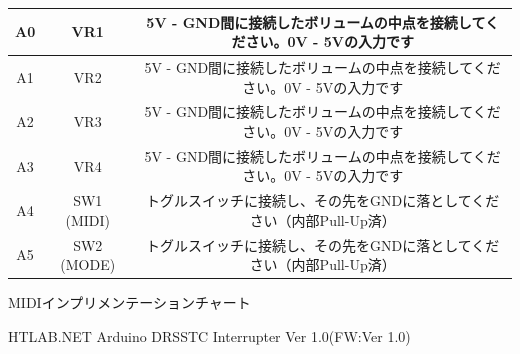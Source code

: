 \documentclass[a4paper,11pt]{jsarticle}
\newcommand{\hwVer}{Ver 1.0}
\newcommand{\fwVer}{Ver 1.0}
\begin{document}
\begin{table}[htbp]
\begin{center}
\begin{tabular}{ | c | c | c |}
A0  & VR1 & 5V - GND間に接続したボリュームの中点を接続してください。0V - 5Vの入力です \\\hline
A1  & VR2 & 5V - GND間に接続したボリュームの中点を接続してください。0V - 5Vの入力です \\\hline
A2  & VR3 & 5V - GND間に接続したボリュームの中点を接続してください。0V - 5Vの入力です \\\hline
A3  & VR4 & 5V - GND間に接続したボリュームの中点を接続してください。0V - 5Vの入力です \\\hline
A4  & SW1 (MIDI) & トグルスイッチに接続し、その先をGNDに落としてください（内部Pull-Up済） \\\hline
A5  & SW2 (MODE) & トグルスイッチに接続し、その先をGNDに落としてください（内部Pull-Up済） \\\hline
\end{tabular}
\end{center}
\end{table}



\clearpage
{}

\begin{center}
\huge{MIDIインプリメンテーションチャート}
\end{center}

\begin{flushright}
\small{HTLAB.NET Arduino DRSSTC Interrupter \hwVer  (FW:\fwVer)}
\end{flushright}
\end{document}
